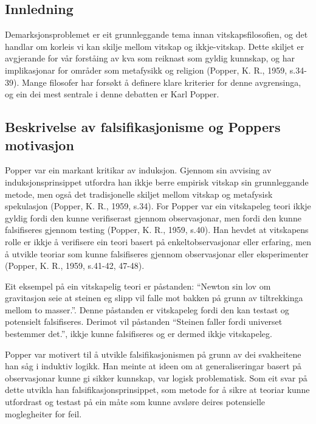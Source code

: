 \documentclass[
  letterpaper,
  DIV=11,
  numbers=noendperiod]{scrreprt}
\begin{document}
\subsection{Innledning}\label{innledning-2}

Demarksjonsproblemet er eit grunnleggande tema innan vitskapsfilosofien,
og det handlar om korleis vi kan skilje mellom vitskap og ikkje-vitskap.
Dette skiljet er avgjerande for vår forståing av kva som reiknast som
gyldig kunnskap, og har implikasjonar for områder som metafysikk og
religion (Popper, K. R., 1959, s.34-39). Mange filosofer har forsøkt å
definere klare kriterier for denne avgrensinga, og ein dei mest sentrale
i denne debatten er Karl Popper.

\subsection{Beskrivelse av falsifikasjonisme og Poppers
motivasjon}\label{beskrivelse-av-falsifikasjonisme-og-poppers-motivasjon}

Popper var ein markant kritikar av induksjon. Gjennom sin avvising av
induksjonsprinsippet utfordra han ikkje berre empirisk vitskap sin
grunnleggande metode, men også det tradisjonelle skiljet mellom vitskap
og metafysisk spekulasjon (Popper, K. R., 1959, s.34). For Popper var
ein vitskapeleg teori ikkje gyldig fordi den kunne verifiserast gjennom
observasjonar, men fordi den kunne falsifiseres gjennom testing (Popper,
K. R., 1959, s.40). Han hevdet at vitskapens rolle er ikkje å verifisere
ein teori basert på enkeltobservasjonar eller erfaring, men å utvikle
teoriar som kunne falsifiseres gjennom observasjonar eller eksperimenter
(Popper, K. R., 1959, s.41-42, 47-48).

Eit eksempel på ein vitskapelig teori er påstanden: ``Newton sin lov om
gravitasjon seie at steinen eg slipp vil falle mot bakken på grunn av
tiltrekkinga mellom to masser.''. Denne påstanden er vitskapeleg fordi
den kan testast og potensielt falsifiseres. Derimot vil påstanden
``Steinen faller fordi universet bestemmer det.'', ikkje kunne
falsifiseres og er dermed ikkje vitskapeleg.

Popper var motivert til å utvikle falsifikasjonismen på grunn av dei
svakheitene han såg i induktiv logikk. Han meinte at ideen om at
generaliseringar basert på observasjonar kunne gi sikker kunnskap, var
logisk problematisk. Som eit svar på dette utvikla han
falsifikasjonsprinsippet, som metode for å sikre at teoriar kunne
utfordrast og testast på ein måte som kunne avsløre deires potensielle
moglegheiter for feil.
\end{document}
